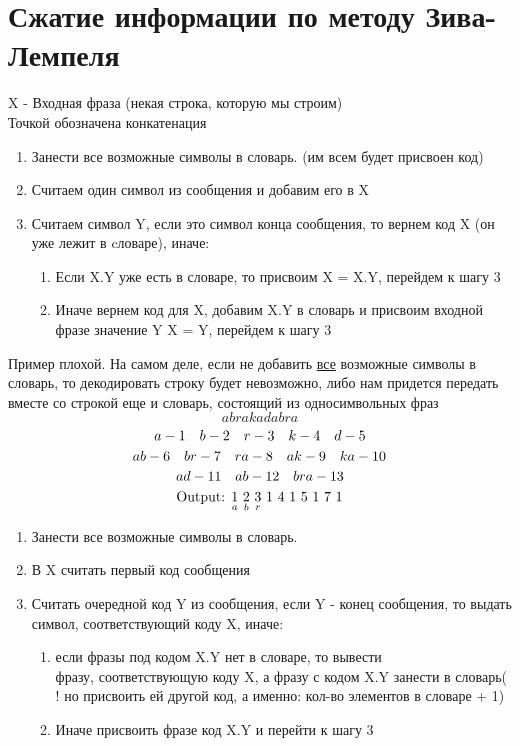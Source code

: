 \documentclass[discrete.tex]{subfiles}
\begin{document}
\section{Сжатие информации по методу Зива-Лемпеля}

\begin{alg}
    X - Входная фраза (некая строка, которую мы строим)\\
    Точкой обозначена конкатенация
    \begin{enumerate}
        \item Занести все возможные символы в словарь. (им всем будет присвоен код)
        \item Считаем один символ из сообщения и добавим его в X
        \item Считаем символ Y, если это символ конца сообщения, то вернем код X (он уже
            лежит в cловаре), иначе:
            \begin{enumerate}
                \item Если X.Y уже есть в словаре, то присвоим X = X.Y, перейдем к шагу 3
                \item Иначе вернем код для X, добавим X.Y в словарь и присвоим входной
                    фразе значение Y \q X = Y, перейдем к шагу 3
            \end{enumerate}
    \end{enumerate}
\end{alg}

\begin{example}
    Пример плохой. На самом деле, если не добавить \ul{все}
    возможные символы в словарь, то декодировать строку будет невозможно, либо нам придется передать вместе со строкой еще и словарь, состоящий из односимвольных фраз
    \[abrakadabra\]
    \[a - 1 \quad b - 2 \quad r - 3 \quad k - 4 \quad d - 5\]
    \[ab - 6 \quad br - 7 \quad ra - 8 \quad ak - 9 \quad ka - 10\]
    \[ad - 11 \quad ab - 12 \quad bra - 13\]
    \[\text{Output: } \us{a}{1} \ \us{b}{2} \ \us{r}{3} \ 1 \ 4 \ 1 \ 5 \ 1 \ 7 \ 1\]
\end{example}

\begin{alg} [декодирование]
    \begin{enumerate}
        \item Занести все возможные символы в словарь.
        \item В X считать первый код сообщения
        \item Считать очередной код Y из сообщения, если Y - конец сообщения, то выдать
            символ, соответствующий коду X, иначе:
            \begin{enumerate}
                \item если фразы под кодом X.Y нет в словаре, то вывести\\ фразу,
                    соответствующую коду X, а фразу с кодом X.Y занести в словарь(
                    ! но присвоить ей другой код, а именно: кол-во элементов в словаре
                    + 1)
                \item Иначе присвоить фразе код X.Y и перейти к шагу 3
            \end{enumerate}
    \end{enumerate}
\end{alg}
\end{document}

